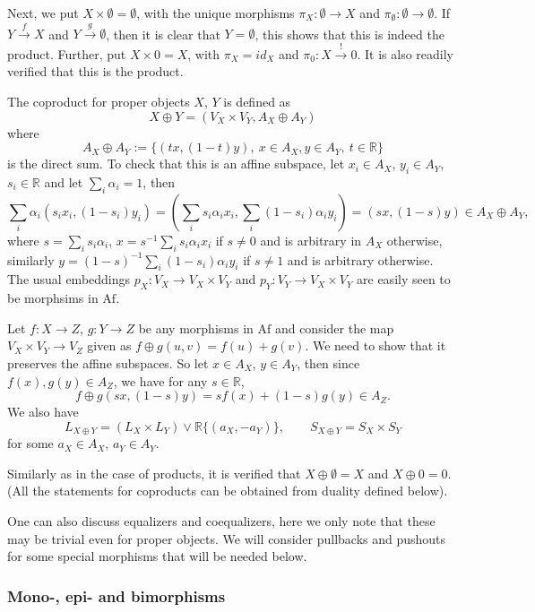 \documentclass[12pt]{article}
\theoremstyle{definition}
\theoremstyle{remark}
\def \Af{\mathrm{Af}}
\def\bX{ X}
\def\bY{ Y}
\def\bZ{Z}
\begin{document}
Next, we put $X\times \emptyset=\emptyset$, with the unique morphisms $\pi_X:\emptyset \to X$
and $\pi_{\emptyset}:\emptyset \to \emptyset$. If $Y\xrightarrow{f}X$ and
$Y\xrightarrow{g} \emptyset$, then it is clear that $Y=\emptyset$, this shows that this is
indeed the product. Further, put  $X\times 0=X$, with $\pi_X=id_X$  and
$\pi_0: X\xrightarrow{!}0$. It is also readily verified that this is the product.

\medskip

The coproduct for proper objects $X$, $Y$ is defined as 
\[
\bX\oplus \bY=(V_\bX\times V_\bY, A_\bX\oplus A_\bY)
\]
where 
\[
A_\bX\oplus A_\bY:=\{(tx,(1-t)y),\ x\in A_{\bX}, y\in A_\bY,\ t\in \mathbb R\}
\]
is the direct sum. To check that this is an affine subspace, let $x_i\in A_\bX$, $y_i\in A_\bY$, $s_i\in
\mathbb R$ and let $\sum_i\alpha_i=1$, then 
\[
\sum_i\alpha_i(s_ix_i,(1-s_i)y_i)=(\sum_is_i\alpha_ix_i,\sum_i(1-s_i)\alpha_iy_i)=(sx,(1-s)y)\in
A_\bX\oplus A_\bY,
\]
where $s=\sum_is_i\alpha_i$, $x=s^{-1}\sum_is_i\alpha_ix_i$ if $s\ne 0$ and is arbitrary
in $A_\bX$ otherwise, similarly $y=(1-s)^{-1}\sum_i(1-s_i)\alpha_iy_i$ if $s\ne 1$ and is
arbitrary otherwise. The usual embeddings  $p_\bX:V_\bX\to V_\bX\times V_\bY$ and $p_\bY:
V_{\bY}\to V_\bX\times V_\bY$ are easily seen to be morphsims in $\Af$.   

Let  $f:\bX\to \bZ$, $g:\bY\to \bZ$ be any morphisms in $\Af$ and consider the map
$V_\bX\times V_\bY\to V_\bZ$ given as
$f\oplus g(u,v)=f(u)+g(v)$. We need to show that it preserves the affine subspaces. So let 
$x\in A_\bX$, $y\in  A_\bY$, then since $f(x),g(y)\in A_\bZ$, we have for any $s\in \mathbb R$,
\[
f\oplus g(sx,(1-s)y)=sf(x)+(1-s)g(y)\in A_\bZ.
\]
We also have
\[
L_{X\oplus Y}= (L_X\times L_Y)\vee \mathbb R\{(a_X,-a_Y)\},\qquad S_{X\oplus Y}=S_X\times
S_Y
\]
for some $a_X\in A_X$, $a_Y\in A_Y$.

Similarly as in the case of products, it is verified that $X\oplus \emptyset=X$ and
$X\oplus 0=0$. (All the statements for coproducts can be obtained from duality defined
below).

\medskip

One can also discuss equalizers and coequalizers, here we only note that these may be
trivial even for proper objects. We will  consider pullbacks and pushouts for some special
morphisms that will be needed below.

\subsubsection{Mono-, epi- and bimorphisms} 
\end{document}
